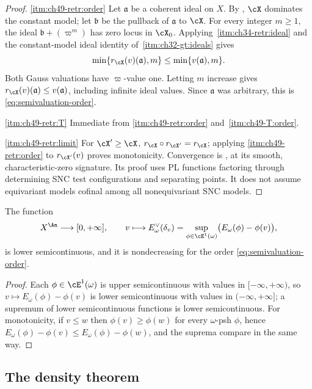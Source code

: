 \begin{proof}
\cref{itm:ch49-retr:order}  Let $\mathfrak a$ be a coherent ideal on
$X$.  By , $\cX$ dominates the constant model;
let $\mathfrak b$ be the pullback of $\mathfrak a$ to $\cX$.
For every integer $m\ge1$, the ideal
$\mathfrak b+(\varpi^m)$ has zero locus in $\cX_0$.
Applying \,\cref{itm:ch34-retr:ideal}
and the constant-model ideal identity of
\,\cref{itm:ch32-gt:ideals} gives
\[
 \min\{r_\cX(v)(\mathfrak a),m\}
 \le \min\{v(\mathfrak a),m\}.
\]
Both Gauss valuations have $\varpi$-value one.  Letting $m$ increase
gives $r_\cX(v)(\mathfrak a)\le v(\mathfrak a)$, including infinite
ideal values.  Since $\mathfrak a$ was arbitrary, this is
\eqref{eq:semivaluation-order}.

\cref{itm:ch49-retr:T}  Immediate from \cref{itm:ch49-retr:order} and
\,\cref{itm:ch49-T:order}.

\cref{itm:ch49-retr:limit}  For $\cX'\ge\cX$,
$r_\cX\circ r_{\cX'}=r_\cX$; applying
\cref{itm:ch49-retr:order} to $r_{\cX'}(v)$ proves monotonicity.
Convergence is \cite[Theorem~A.1]{BJ22}, at its smooth,
characteristic-zero signature.  Its proof uses PL functions factoring
through determining SNC test configurations and separating points.
It does not assume equivariant models cofinal among all
nonequivariant SNC models.
\end{proof}

\begin{lemma}
\label{lem:ch49-dual-lsc}
The function
\[
 X^{\An}\longrightarrow[0,+\infty],
 \qquad
 v\longmapsto E^\vee_\omega(\delta_v)
 =\sup_{\phi\in\cE^1(\omega)}\bigl(E_\omega(\phi)-\phi(v)\bigr),
\]
is lower semicontinuous, and it is nondecreasing for the order
\eqref{eq:semivaluation-order}.
\end{lemma}

\begin{proof}
Each $\phi\in\cE^1(\omega)$ is upper semicontinuous with values in
$[-\infty,+\infty)$, so $v\mapsto E_\omega(\phi)-\phi(v)$ is lower
semicontinuous with values in $(-\infty,+\infty]$; a supremum of lower
semicontinuous functions is lower semicontinuous.  For monotonicity, if
$v\le w$ then $\phi(v)\ge\phi(w)$ for every $\omega$-psh $\phi$,
hence $E_\omega(\phi)-\phi(v)\le E_\omega(\phi)-\phi(w)$, and the
suprema compare in the same way.
\end{proof}

\subsection{The density theorem}
\label{sec:ch49-density-theorem}


